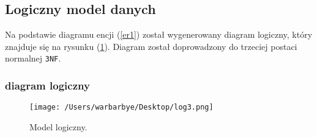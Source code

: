 \documentclass{article}
\newcommand{\todo}[1]{
	\colorbox{yellow} {{\color{red}
	\emph {TODO: #1}
}}}
\begin{document}
\subsection{Logiczny model danych}
Na podstawie diagramu encji (\ref{er1}) został wygenerowany diagram logiczny, który znajduje się na rysunku (\ref{log1}). Diagram został doprowadzony do trzeciej postaci normalnej \texttt{3NF}.
\subsubsection{diagram logiczny}
\begin{figure}[H]
			\centering

			\texttt{[image: /Users/warbarbye/Desktop/log3.png]}
					\label{log1}
			\caption{Model logiczny.}
\end{figure}

\end{document}

